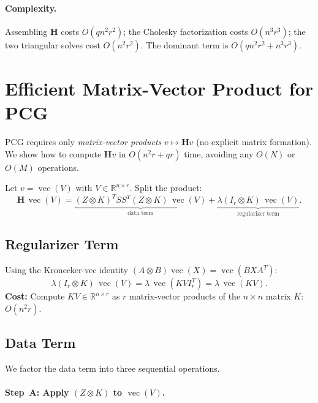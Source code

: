 \documentclass[12pt]{article}
\theoremstyle{definition}
\DeclareMathOperator{\vecop}{vec}
\begin{document}
\paragraph{Complexity.}
Assembling $\mathbf{H}$ costs $O(q n^2 r^2)$; the Cholesky factorization costs $O(n^3 r^3)$;
the two triangular solves cost $O(n^2 r^2)$.  The dominant term is $O(q n^2 r^2 + n^3 r^3)$.

\section{Efficient Matrix-Vector Product for PCG}

PCG requires only \emph{matrix-vector products} $v \mapsto \mathbf{H} v$ (no explicit matrix
formation).  We show how to compute $\mathbf{H} v$ in $O(n^2 r + qr)$ time, avoiding any
$O(N)$ or $O(M)$ operations.

Let $v = \vecop(V)$ with $V \in \mathbb{R}^{n \times r}$.  Split the product:
\begin{equation}
  \mathbf{H}\,\vecop(V)
  = \underbrace{(Z \otimes K)^T SS^T (Z \otimes K)\,\vecop(V)}_{\text{data term}}
    + \underbrace{\lambda(I_r \otimes K)\,\vecop(V)}_{\text{regularizer term}}.
  \label{eq:Hv-split}
\end{equation}

\subsection{Regularizer Term}

Using the Kronecker-vec identity $(A \otimes B)\vecop(X) = \vecop(BXA^T)$:
\[
  \lambda(I_r \otimes K)\,\vecop(V) = \lambda\,\vecop(KV I_r^T) = \lambda\,\vecop(KV).
\]
\textbf{Cost:} Compute $KV \in \mathbb{R}^{n \times r}$ as $r$ matrix-vector products of the
$n \times n$ matrix $K$: $O(n^2 r)$.

\subsection{Data Term}

We factor the data term into three sequential operations.

\paragraph{Step~A: Apply $(Z \otimes K)$ to $\vecop(V)$.}
\end{document}
